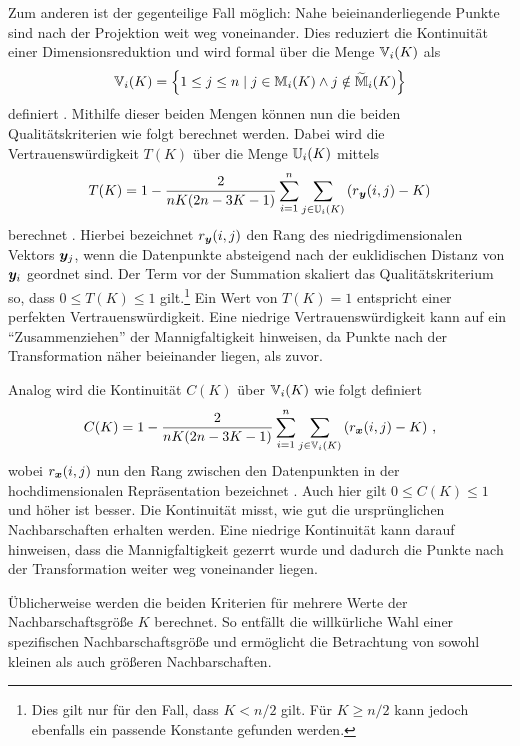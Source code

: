 Zum anderen ist der gegenteilige Fall möglich: Nahe beieinanderliegende Punkte sind nach der
Projektion weit weg voneinander. Dies reduziert die Kontinuität einer Dimensionsreduktion und wird
formal über die Menge $\mathbb{V}_i(K)$ als
\begin{equation}
	\mathbb{V}_i(K) =  \left\{ 1 \leq j \leq n \mid j \in \mathbb{M}_i(K) \land j \notin \widetilde{\mathbb{M}}_i(K) \right\}
\end{equation}
definiert \parencite[487]{Venna.2001}. Mithilfe dieser beiden Mengen können nun die beiden Qualitätskriterien wie
folgt berechnet werden. Dabei wird die Vertrauenswürdigkeit $T(K)$ über die Menge $\mathbb{U}_i(K)$
mittels
\begin{equation}
	T(K) = 1 - \frac{2}{nK(2n - 3K - 1)} \sum_{i = 1}^{n}\sum_{j \in \set{U}_i(K) } \left( r­_{\vect{y}}(i, j) - K \right)
\end{equation}
berechnet \parencite[487]{Venna.2001}. Hierbei bezeichnet $r_{\bm{y}}(i, j)$ den Rang des niedrigdimensionalen
Vektors $\bm{y}_j$, wenn die Datenpunkte absteigend nach der euklidischen Distanz von
$\bm{y}_i$ geordnet sind. Der Term vor der Summation skaliert das Qualitätskriterium so, dass $0
	\leq T(K) \leq 1$ gilt.\footnote{Dies gilt nur für den Fall, dass $K < n/2$ gilt. Für $K \geq n/2$
	kann jedoch ebenfalls ein passende Konstante gefunden werden.} Ein Wert von $T(K) = 1­$ entspricht
einer perfekten Vertrauenswürdigkeit. Eine niedrige Vertrauenswürdigkeit kann auf ein
\enquote{Zusammenziehen} der Mannigfaltigkeit hinweisen, da Punkte nach der Transformation näher
beieinander liegen, als zuvor.

Analog wird die Kontinuität $C(K)$ über $\mathbb{V}_i(K)$ wie folgt definiert
\begin{equation}
	C(K) = 1 - \frac{2}{nK(2n - 3K - 1)} \sum_{i = 1}^{n}\sum_{j \in \mathbb{V}_i(K) } \left( r_{\bm{x}}(i, j) - K \right) \, ,
\end{equation}
wobei $r_{\bm{x}}(i, j)$ nun den Rang zwischen den Datenpunkten in der hochdimensionalen Repräsentation bezeichnet \parencite[487]{Venna.2001}. Auch hier gilt $0 \leq C(K) \leq 1$ und höher ist besser. Die Kontinuität
misst, wie gut die ursprünglichen Nachbarschaften erhalten werden. Eine niedrige Kontinuität kann
darauf hinweisen, dass die Mannigfaltigkeit gezerrt wurde und dadurch die Punkte nach der
Transformation weiter weg voneinander liegen.

Üblicherweise werden die beiden Kriterien für mehrere Werte der Nachbarschaftsgröße $K$ berechnet. So entfällt die willkürliche Wahl einer spezifischen Nachbarschaftsgröße und ermöglicht die Betrachtung von sowohl kleinen als auch größeren Nachbarschaften.

